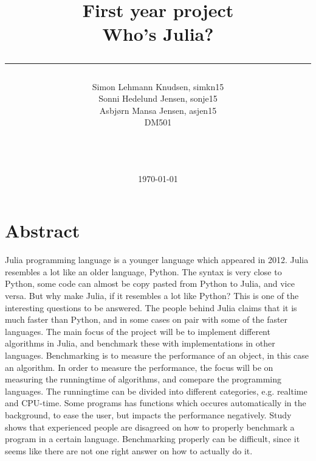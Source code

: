 \documentclass[a4paper,11pt]{article}
\title{First year project\\Who's Julia?\\\rule{10cm}{0.5mm}}
\author{Simon Lehmann Knudsen, simkn15\\Sonni Hedelund Jensen, sonje15\\Asbjørn Mansa Jensen, asjen15
\\ DM501\\\rule{5.5cm}{0.5mm}\\}
\date{\today}
\begin{document}
\maketitle

\vfill

\newpage
\section*{Abstract}
Julia programming language is a younger language which appeared in 2012. Julia resembles a lot like an older language, Python. The syntax is very close to Python, some code can almost be copy pasted from Python to Julia, and vice versa. But why make Julia, if it resembles a lot like Python? This is one of the interesting questions to be answered. The people behind Julia claims that it is much faster than Python, and in some cases on pair with some of the faster languages. The main focus of the project will be to implement different algorithms in Julia, and benchmark these with implementations in other languages. Benchmarking is to measure the performance of an object, in this case an algorithm. In order to measure the performance, the focus will be on measuring the runningtime of algorithms, and comepare the programming languages. The runningtime can be divided into different categories, e.g. realtime and CPU-time. Some programs has functions which occures automatically in the background, to ease the user, but impacts the performance negatively. Study shows that experienced people are disagreed on how to properly benchmark a program in a certain language. Benchmarking properly can be difficult, since it seems like there are not one right answer on how to actually do it.
\end{document}
